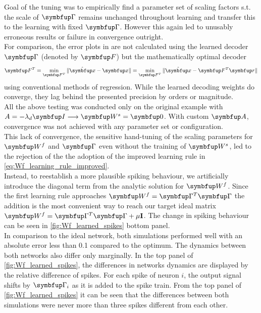 Goal of the tuning was to empirically find a parameter set of scaling factors s.t. the scale of $\bmu{\Gamma}$ remains unchanged throughout learning and transfer this to the learning with fixed $\bmu{\Gamma}$. However this again led to unusably erroneous results or failure in convergence outright.\\
For comparison, the error plots in \cite{brendel_learning_2020} are not calculated using the learned decoder $\bmu{\Gamma}$ (denoted by $\bmu{F}$) but the mathematically optimal decoder
\begin{equation}
\bmu{F}^T = \min_{\bmu{F}^T} \|\hat{\bmu{x}} - \bmu{x}\| = \min_{\bmu{F}^T} \|\hat{\bmu{x}} - \bmu{F}^T\bmu{r}\|
\end{equation}
using conventional methods of regression. While the learned decoding weights do converge, they lag behind the presented precision by orders or magnitude.\\
All the above testing was conducted only on the original example with $A = -\lambda_d\bmu{I} \longrightarrow \bmu{W}^s = \bmu{0}$. With custom $\bmu{A}$, convergence was not achieved with any parameter set or configuration.\\
This lack of convergence, the sensitive hand-tuning of the scaling parameters for $\bmu{W}^f$ and $\bmu{\Gamma}$ even without the training of $\bmu{W}^s$, led to the rejection of the the adoption of the improved learning rule in \cref{eq:Wf_learning_rule_improved}.\\
Instead, to reestablish a more plausible spiking behaviour, we
artificially introduce the diagonal term from the analytic solution for $\bmu{W}^f$. Since the first learning rule approaches $\bmu{W}^f = \bmu{\Gamma}^T\bmu{\Gamma}$ the addition is the most convenient way to reach our target ideal matrix $\bmu{W}^f = \bmu{\Gamma}^T\bmu{\Gamma} + \mu\mathbf{I}$. The change in spiking behaviour can be seen in \cref{fig:Wf_learned_spikes} bottom panel.\\
In comparison to the ideal network, both simulations performed well with an absolute error less than 0.1 compared to the optimum. The dynamics between both networks also differ only marginally. In the top panel of \cref{fig:Wf_learned_spikes}, the differences in networks dynamics are displayed by the relative difference of spikes. For each spike of neuron $i$, the output signal shifts by $\bmu{\Gamma}_i$ as it is added to the spike train. From the top panel of \cref{fig:Wf_learned_spikes} it can be seen that the differences between both simulations were never more than three spikes different from each other.

